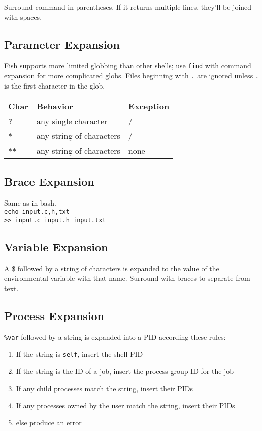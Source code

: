 \documentclass[10pt]{extarticle}
\begin{document}
\begin{paracol}{2}
Surround command in parentheses.
If it returns multiple lines, they'll be joined with spaces.

\subsection*{Parameter Expansion}

Fish supports more limited globbing than other shells; use \texttt{find} with command expansion for more complicated globs.
Files beginning with \texttt{.} are ignored unless \texttt{.} is the first character in the glob.

\begin{tabularx}{\columnwidth}{X X X}
    \rowcolor{DarkBackground}
    \textbf{Char} & \textbf{Behavior} & \textbf{Exception} \\
    \texttt{?} & any single character & / \\
    \texttt{*} & any string of characters & / \\
    \texttt{**} & any string of characters & none
\end{tabularx}

\subsection*{Brace Expansion}

Same as in bash.\\
\texttt{echo input.{c,h,txt}}\\
\texttt{>> input.c input.h input.txt}

\subsection*{Variable Expansion}

A \$ followed by a string of characters is expanded to the value of the environmental variable with that name.
Surround with braces to separate from text.

\subsection*{Process Expansion}

\texttt{\%var} followed by a string is expanded into a PID according these rules:

\begin{enumerate}
    \item If the string is \texttt{self}, insert the shell PID
    \item If the string is the ID of a job, insert the process group ID for the job
    \item If any child processes match the string, insert their PIDs
    \item If any processes owned by the user match the string, insert their PIDs
    \item else produce an error
\end{enumerate}


\end{paracol}
\end{document}
